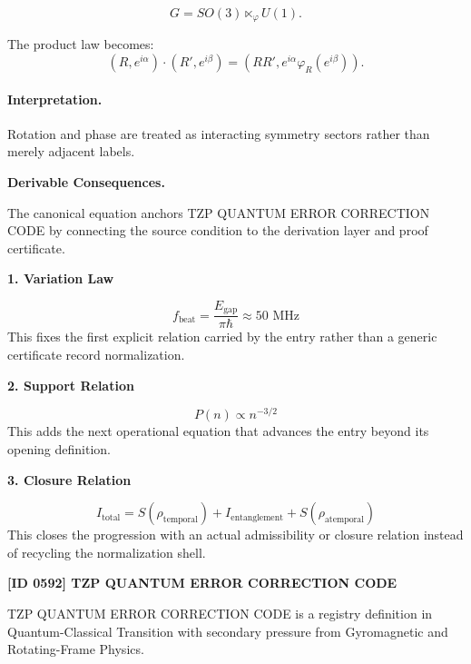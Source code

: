 \begin{equation}
G=SO(3)\ltimes_{\varphi}U(1).
\end{equation}

The product law becomes:
\begin{equation}
\boxed{
(R,e^{i\alpha})\cdot(R',e^{i\beta})
=
\left(
RR',
e^{i\alpha}\varphi_R(e^{i\beta})
\right).
}
\end{equation}

\paragraph{Interpretation.}
Rotation and phase are treated as interacting symmetry sectors rather than merely adjacent labels.

\par\vspace{0.35em}
\noindent\textbf{Derivable Consequences.}\quad
\begingroup
\footnotesize
\raggedright
The canonical equation anchors TZP QUANTUM ERROR CORRECTION CODE by connecting the source condition to the derivation layer and proof certificate.
\par\endgroup

\noindent\textbf{1. Variation Law}\par
\[
f_{\text{beat}} = \frac{E_{\text{gap}}}{\pi \hbar} \approx 50 \text{ MHz}
\]
\noindent This fixes the first explicit relation carried by the entry rather than a generic certificate record normalization.\par
\noindent\textbf{2. Support Relation}\par
\[
P(n) \propto n^{-3/2}
\]
\noindent This adds the next operational equation that advances the entry beyond its opening definition.\par
\noindent\textbf{3. Closure Relation}\par
\[
I_{\text{total}} = S(\rho_{\text{temporal}}) + I_{\text{entanglement}} + S(\rho_{\text{atemporal}})
\]
\noindent This closes the progression with an actual admissibility or closure relation instead of recycling the normalization shell.\par

\clearpage
\noindent\textbf{[ID 0592] TZP QUANTUM ERROR CORRECTION CODE}\par
\vspace{0.35em}
\begingroup\small
{}
TZP QUANTUM ERROR CORRECTION CODE is a registry definition in Quantum-Classical Transition with secondary pressure from Gyromagnetic and Rotating-Frame Physics.

